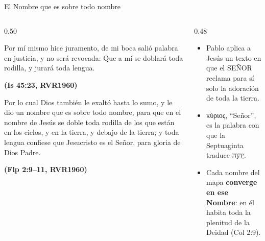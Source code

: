 \documentclass[hyperref={bookmarks=false},aspectratio=169]{beamer}
\newcommand{\heb}[1]{\mbox{\foreignlanguage{hebrew}{#1}}}
\newcommand{\grc}[1]{\foreignlanguage{ancientgreek}{#1}}
\newcommand{\fuente}[1]{\par\hfill{\upshape\bfseries\footnotesize\textcolor{azulp}{#1}}}
\newcommand{\destacar}[1]{\textbf{\textcolor{azulp}{#1}}}
\newcommand{\SENOR}{SEÑOR}
\begin{document}
\begin{frame}{El Nombre que es sobre todo nombre}
\begin{columns}[c,onlytextwidth]
\begin{column}{0.50\textwidth}
\begin{cita}Por mí mismo hice juramento, de mi boca salió palabra en justicia, y no será revocada: Que a mí se doblará toda rodilla, y jurará toda lengua.\fuente{(Is 45:23, RVR1960)}\end{cita}
\begin{cita}Por lo cual Dios también le exaltó hasta lo sumo, y le dio un nombre que es sobre todo nombre, para que en el nombre de Jesús se doble toda rodilla de los que están en los cielos, y en la tierra, y debajo de la tierra; y toda lengua confiese que Jesucristo es el Señor, para gloria de Dios Padre.\fuente{(Flp 2:9--11, RVR1960)}\end{cita}
\end{column}
\begin{column}{0.48\textwidth}\small
\begin{itemize}
\item Pablo aplica a Jesús un texto en que el \SENOR{} reclama para sí solo la adoración de toda la tierra.
\item \grc{κύριος}, ``Señor'', es la palabra con que la Septuaginta traduce \heb{יְהוָה}.
\item Cada nombre del mapa \destacar{converge en ese Nombre}: en él habita toda la plenitud de la Deidad (Col 2:9).
\end{itemize}
\end{column}
\end{columns}
\end{frame}

\end{document}
